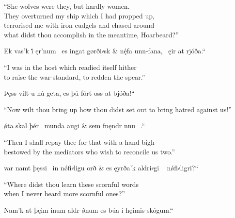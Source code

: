 \bvb{}%
“She-wolves were they, but hardly women. \\
They overturned my ship which I had propped up, \\
terrorised me with iron cudgels and chased  around--- \\
\ind what didst thou accomplish in the meantime, Hoarbeard?”\evb\evg


\bvg\bva{}%
%
Ek vas’k i̇́ ęr’num \hld\ es ingat gørði⸗sk &
nę́fa unn-fana, \hld\ ęir at rjóða.“\eva

\bvb{}%
“I was in the host which readied itself hither \\
to raise the war-standard, to redden the spear.”\evb\evg


\bvg\bva{}%
%
%
Þęss vilt-u nú geta, es þú fórt oss  at bjóða!“\eva

\bvb{}%
“Now wilt thou bring up how thou didst set out to bring hatred against us!”\evb\evg


\bvg\bva{}%
%
ǿta skal þér  \hld\ munda augi &
sem fnęndr nnu \hld\ .“\eva

\bvb{}%
“Then I shall repay thee for that with a hand-bigh \\
bestowed by the mediators who wish to reconcile us two.”\evb\evg


\bvg\bva{}%
%
var namt þęssi \hld\ in nǿfi⸗ligu orð &
es ęyrða’k aldri⸗gi \hld\  nǿfi⸗ligri?“\eva

\bvb{}%
“Where didst thou learn these scornful words \\
when I never heard more scornful ones?”\evb\evg


\bvg\bva{}%
%
Nam’k at  þęim inum aldr-ǿnum es búa í hęimis-skógum.“\eva

